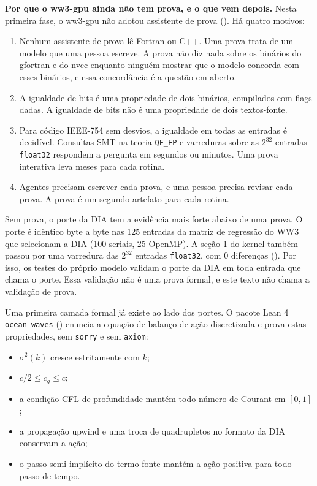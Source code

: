 \documentclass[10pt,a4paper,]{article}
\providecommand{\tightlist}{\setlength{\itemsep}{0pt}\setlength{\parskip}{0pt}}
\begin{document}
\textbf{Por que o ww3-gpu ainda não tem prova, e o que vem depois.}
Nesta primeira fase, o ww3-gpu não adotou assistente de prova
(). Há quatro motivos:

\begin{enumerate}
\def\labelenumi{\arabic{enumi}.}
\tightlist
\item
  Nenhum assistente de prova lê Fortran ou C++. Uma prova trata de um
  modelo que uma pessoa escreve. A prova não diz nada sobre os binários
  do gfortran e do nvcc enquanto ninguém mostrar que o modelo concorda
  com esses binários, e essa concordância é a questão em aberto.
\item
  A igualdade de bits é uma propriedade de dois binários, compilados com
  flags dadas. A igualdade de bits não é uma propriedade de dois
  textos-fonte.
\item
  Para código IEEE-754 sem desvios, a igualdade em todas as entradas é
  decidível. Consultas SMT na teoria \texttt{QF\_FP} e varreduras sobre
  as \(2^{32}\) entradas \texttt{float32} respondem a pergunta em
  segundos ou minutos. Uma prova interativa leva meses para cada rotina.
\item
  Agentes precisam escrever cada prova, e uma pessoa precisa revisar
  cada prova. A prova é um segundo artefato para cada rotina.
\end{enumerate}

Sem prova, o porte da DIA tem a evidência mais forte abaixo de uma
prova. O porte é idêntico byte a byte nas 125 entradas da matriz de
regressão do WW3 que selecionam a DIA (100 seriais, 25 OpenMP). A seção
1 do kernel também passou por uma varredura das \(2^{32}\) entradas
\texttt{float32}, com 0 diferenças (). Por isso, os testes do próprio modelo validam o porte da DIA em
toda entrada que chama o porte. Essa validação não é uma prova formal, e
este texto não chama a validação de prova.

Uma primeira camada formal já existe ao lado dos portes. O pacote Lean 4
\texttt{ocean-waves} () enuncia
a equação de balanço de ação discretizada e prova estas propriedades,
sem \texttt{sorry} e sem \texttt{axiom}:

\begin{itemize}
\tightlist
\item
  \(\sigma^2(k)\) cresce estritamente com \(k\);
\item
  \(c/2 \le c_g \le c\);
\item
  a condição CFL de profundidade mantém todo número de Courant em
  \([0, 1]\);
\item
  a propagação upwind e uma troca de quadrupletos no formato da DIA
  conservam a ação;
\item
  o passo semi-implícito do termo-fonte mantém a ação positiva para todo
  passo de tempo.
\end{itemize}
\end{document}
